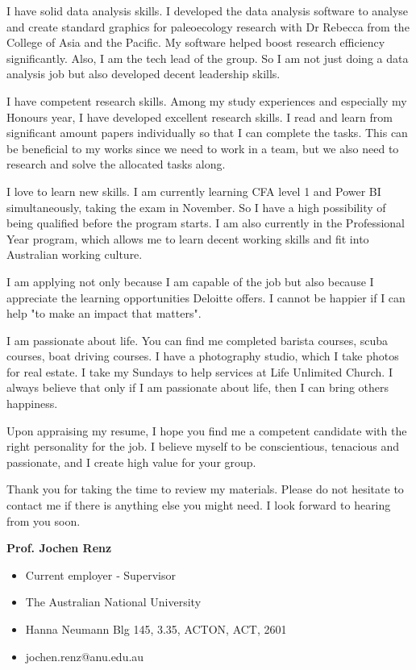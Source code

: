 \documentclass[11pt, a4paper]{awesome-cv}
\begin{document}
\begin{cvletter}
I have solid data analysis skills. I developed the data analysis software to analyse and create standard graphics for paleoecology research with Dr Rebecca from the College of Asia and the Pacific. My software helped boost research efficiency significantly. Also, I am the tech lead of the group. So I am not just doing a data analysis job but also developed decent leadership skills.

I have competent research skills. Among my study experiences and especially my Honours year, I have developed excellent research skills. I read and learn from significant amount papers individually so that I can complete the tasks. This can be beneficial to my works since we need to work in a team, but we also need to research and solve the allocated tasks along.

I love to learn new skills. I am currently learning CFA level 1 and Power BI simultaneously, taking the exam in November. So I have a high possibility of being qualified before the program starts. I am also currently in the Professional Year program, which allows me to learn decent working skills and fit into Australian working culture.

I am applying not only because I am capable of the job but also because I appreciate the learning opportunities Deloitte offers. I cannot be happier if I can help "to make an impact that matters". 

I am passionate about life. You can find me completed barista courses, scuba courses, boat driving courses. I have a photography studio, which I take photos for real estate. I take my Sundays to help services at Life Unlimited Church. I always believe that only if I am passionate about life, then I can bring others happiness.

Upon appraising my resume, I hope you find me a competent candidate with the right personality for the job. I believe myself to be conscientious, tenacious and passionate, and I create high value for your group.

Thank you for taking the time to review my materials. Please do not hesitate to contact me if there is anything else you might need. I look forward to hearing from you soon.


\textbf{Prof. Jochen Renz}
\begin{itemize}
	\item Current employer ‑ Supervisor
	\item The Australian National University
	\item Hanna Neumann Blg 145, 3.35, ACTON, ACT, 2601
	\item jochen.renz@anu.edu.au
\end{itemize}


\end{cvletter}
\end{document}

